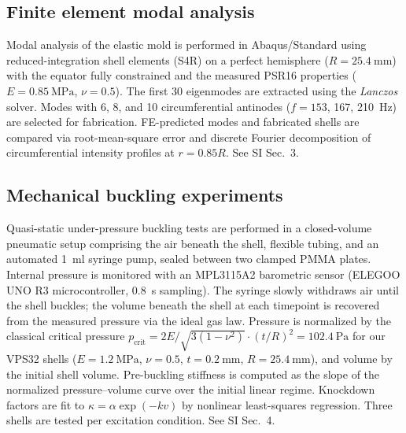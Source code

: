 \documentclass[twocolumn,letter,11pt]{article}
\begin{document}
\subsection*{Finite element modal analysis}
Modal analysis of the elastic mold is performed in Abaqus/Standard using reduced-integration shell elements (S4R) on a perfect hemisphere ($R = \SI{25.4}{\milli\metre}$) with the equator fully constrained and the measured PSR16 properties ($E = \SI{0.85}{\mega\pascal}$, $\nu = 0.5$). The first 30 eigenmodes are extracted using the \textit{Lanczos} solver. Modes with 6, 8, and 10 circumferential antinodes ($f = 153$, 167, \SI{210}{\hertz}) are selected for fabrication. FE-predicted modes and fabricated shells are compared via root-mean-square error and discrete Fourier decomposition of circumferential intensity profiles at $r = 0.85R$. See SI Sec.~3.

\subsection*{Mechanical buckling experiments}
Quasi-static under-pressure buckling tests are performed in a closed-volume pneumatic setup comprising the air beneath the shell, flexible tubing, and an automated \SI{1}{\milli\litre} syringe pump, sealed between two clamped PMMA plates. Internal pressure is monitored with an MPL3115A2 barometric sensor (ELEGOO UNO R3 microcontroller, \SI{0.8}{\second} sampling). The syringe slowly withdraws air until the shell buckles; the volume beneath the shell at each timepoint is recovered from the measured pressure via the ideal gas law. Pressure is normalized by the classical critical pressure $p_\mathrm{crit} = 2E/\sqrt{3(1-\nu^2)} \cdot (t/R)^2 = \SI{102.4}{\pascal}$ for our VPS32 shells ($E = \SI{1.2}{\mega\pascal}$, $\nu = 0.5$, $t = \SI{0.2}{\milli\metre}$, $R = \SI{25.4}{\milli\metre}$), and volume by the initial shell volume. Pre-buckling stiffness is computed as the slope of the normalized pressure--volume curve over the initial linear regime. Knockdown factors are fit to $\kappa = \alpha \exp(-k v)$ by nonlinear least-squares regression. Three shells are tested per excitation condition. See SI Sec.~4.
\end{document}
